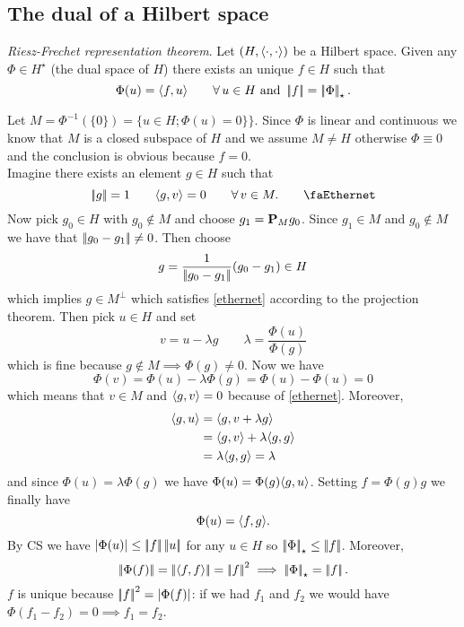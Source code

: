 \documentclass{article}
\begin{document}
\subsection{The dual of a Hilbert space}
\begin{theorem}
	\emph{Riesz-Frechet representation theorem}. Let $\left(H,\langle \cdot,\cdot \rangle\right)$ be a Hilbert space. Given any $\Phi\in H^{\star}$ (the dual space of $H$) there exists an unique $f\in H$ such that
	\begin{equation*}
		\Phi(u)=\langle f,u \rangle\qquad\forall\, u\in H\text{ and }\left|\negthinspace\left|f\right|\negthinspace\right|=\left|\negthinspace\left|\Phi\right|\negthinspace\right|_{\star}.
	\end{equation*}
\end{theorem}
\begin{fancyproof}
	Let $M=\Phi^{-1}(\{0\})=\{u\in H;\Phi(u)=0\}\}$. Since $\Phi$ is linear and continuous we know that $M$ is a closed subspace of $H$ and we assume $M\neq H$ otherwise $\Phi\equiv0$ and the conclusion is obvious because $f=0$.\\
	Imagine there exists an element $g\in H$ such that
	\begin{equation*}
		\norm{g}=1\qquad\inprod{g,v}=0\qquad\every v\in M.\tag*{\faEthernet}\label{ethernet}
	\end{equation*}
	Now pick $g_{0}\in H$ with $g_{0}\notin M$ and choose $g_{1}=\mathbf{P}_{M}g_{0}$. Since $g_{1}\in M$ and $g_{0}\notin M$ we have that $\left|\negthinspace\left|g_{0}-g_{1}\right|\negthinspace\right|\neq0$. Then choose
	\begin{equation*}
		g=\frac{1}{\left|\negthinspace\left|g_{0}-g_{1}\right|\negthinspace\right|}(g_{0}-g_{1})\in H
	\end{equation*}
which implies $g\in M^{\perp}$ which satisfies \ref{ethernet} according to the projection theorem. Then pick $u\in H$ and set
	\begin{equation*}
		v=u-\lambda g\qquad\lambda=\frac{\Phi(u)}{\Phi(g)}
	\end{equation*}
	which is fine because $g\notin M\implies \Phi(g)\neq 0$. Now we have
	\begin{equation*}
		\Phi(v)=\Phi(u)-\lambda\Phi(g)=\Phi(u)-\Phi(u)=0
	\end{equation*}
	which means that $v\in M$ and $\langle g,v \rangle=0$ because of \ref{ethernet}. Moreover,
	\begin{align*}
		\langle g,u \rangle&=\langle g,v+\lambda g \rangle\\
		&=\langle g,v \rangle+\lambda\langle g,g \rangle\\
		&=\lambda\langle g,g \rangle=\lambda
	\end{align*}
	and since $\Phi(u)=\lambda\Phi(g)$ we have $\Phi(u)=\Phi(g)\langle g,u \rangle$. Setting $f=\Phi(g)g$ we finally have
	\begin{equation*}
		\Phi(u)=\langle f,g \rangle.
	\end{equation*}
	By CS we have $|\Phi(u)|\leq\left|\negthinspace\left|f\right|\negthinspace\right|\left|\negthinspace\left|u\right|\negthinspace\right|$ for any $u\in H$ so $\left|\negthinspace\left|\Phi\right|\negthinspace\right|_{\star}\leq\left|\negthinspace\left|f\right|\negthinspace\right|$. Moreover, 
	\begin{equation*}
		\norm{\Phi(f)}=\norm{\inprod{f,f}}=\norm{f}^{2}\implies\norm{\Phi}_{\star}=\norm{f}.
	\end{equation*}
	$f$ is unique because $\left|\negthinspace\left|f\right|\negthinspace\right|^{2}=|\Phi(f)|$: if we had $f_{1}$ and $f_{2}$ we would have $\Phi(f_{1}-f_{2})=0\implies f_{1}=f_{2}$.
\end{fancyproof}
\end{document}
